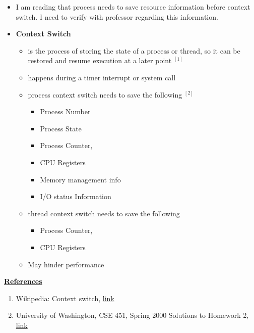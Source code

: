 \documentclass[12pt]{article}
\begin{document}
\begin{itemize}
    \item I am reading that process needs to save resource information
    before context switch. I need to verify with professor regarding this information.
    \item \textbf{Context Switch}

    \begin{itemize}
        \item is the process of storing the state of a process or thread,
        so it can be restored and resume execution at a later point $^{[1]}$
        \item happens during a timer interrupt or system call
        \item process context switch needs to save the following $^{[2]}$

        \begin{itemize}
            \item Process Number
            \item Process State
            \item Process Counter,
            \item CPU Registers
            \item Memory management info
            \item I/O status Information
        \end{itemize}

        \item thread context switch needs to save the following

        \begin{itemize}
            \item Process Counter,
            \item CPU Registers
        \end{itemize}

        \item May hinder performance
    \end{itemize}
\end{itemize}

\bigskip

\underline{\textbf{References}}

\begin{enumerate}[1)]
    \item Wikipedia: Context switch, \href{https://en.wikipedia.org/wiki/Context_switch}{link}
    \item University of Washington, CSE 451, Spring 2000 Solutions to Homework 2, \href{https://courses.cs.washington.edu/courses/cse451/00sp/homeworks/hw2soln.txt}{link}
\end{enumerate}
\end{document}

